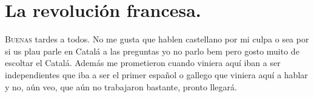 \chapter{La revolución francesa.}


\lettrine[lines=2, findent=3pt, nindent=0pt]{B}{uenas} tardes a todos. No me gusta que hablen castellano por mi culpa o sea por si us plau parle en Catalá a las preguntas yo no parlo bem pero gosto muito de escoltar el Catalá. Además me prometieron cuando viniera aquí iban a ser independientes que iba a ser el primer español o gallego que viniera aquí a hablar y no, aún veo, que aún no trabajaron bastante, pronto llegará.


